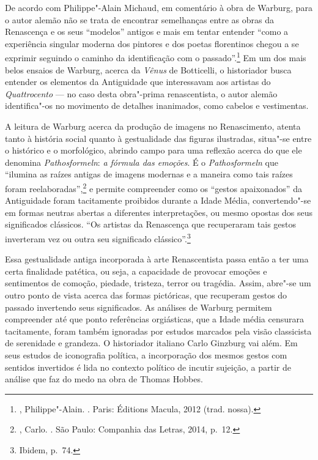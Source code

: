 De acordo com Philippe"-Alain Michaud, em comentário à obra de Warburg,
para o autor alemão não se trata de encontrar semelhanças entre as obras
da Renascença e os seus ``modelos'' antigos e mais em tentar entender
``como a experiência singular moderna dos pintores e dos poetas
florentinos chegou a se exprimir seguindo o caminho da identificação com
o passado''.\footnote{, Philippe"-Alain. {}. Paris: Éditions Macula, 2012 (trad. nossa).} %
Em um dos mais belos ensaios de Warburg, acerca da
\emph{Vênus} de Botticelli, o historiador busca entender os elementos da
Antiguidade que interessavam aos artistas do \emph{Quattrocento} --- no
caso desta obra"-prima renascentista, o autor alemão identifica"-os no
movimento de detalhes inanimados, como cabelos e vestimentas.

A leitura de Warburg acerca da produção de imagens no Renascimento,
atenta tanto à história social quanto à gestualidade das figuras
ilustradas, situa"-se entre o histórico e o morfológico, abrindo campo
para uma reflexão acerca do que ele denomina \emph{Pathosformeln}:
\emph{a fórmula das emoções}. É o \emph{Pathosformeln} que ``ilumina as
raízes antigas de imagens modernas e a maneira como tais raízes foram
reelaboradas'',\footnote{, Carlo. {}. São Paulo: Companhia das Letras, 2014, p.~12.} e permite compreender como os ``gestos apaixonados'' da Antiguidade foram
tacitamente proibidos durante a Idade Média, convertendo"-se em formas
neutras abertas a diferentes interpretações, ou mesmo opostas dos seus
significados clássicos. ``Os artistas da Renascença que recuperaram tais
gestos inverteram vez ou outra seu significado clássico''.\footnote{Ibidem, p.~74.}

Essa gestualidade antiga incorporada à arte Renascentista passa então a
ter uma certa finalidade patética, ou seja, a capacidade de provocar
emoções e sentimentos de comoção, piedade, tristeza, terror ou tragédia.
Assim, abre"-se um outro ponto de vista acerca das formas pictóricas, que
recuperam gestos do passado invertendo seus significados. As análises de
Warburg permitem compreender até que ponto referências orgiásticas, que
a Idade média censurara tacitamente, foram também ignoradas por estudos
marcados pela visão classicista de serenidade e grandeza. O historiador
italiano Carlo Ginzburg vai além. Em seus estudos de iconografia
política, a incorporação dos mesmos gestos com sentidos invertidos é
lida no contexto político de incutir sujeição, a partir de análise que
faz do medo na obra de Thomas Hobbes.

